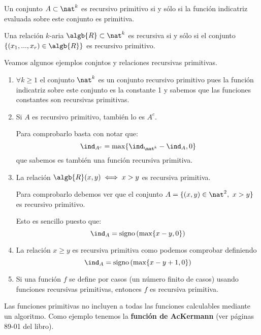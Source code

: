 \begin{defn}
Un conjunto $A \subset \nat^k$ es recursivo primitivo si y sólo si la función indicatriz evaluada sobre este conjunto es primitiva.
\end{defn}

\begin{defn}
Una relación $k$-aria $\algb{R} \subset \nat^k$ es recursiva  si y sólo si el conjunto $\{(x_1,...,x_r)\in \algb{R}\}$ es recursivo primitivo.
\end{defn}

Veamos algunos ejemplos conjntos y relaciones recursivas primitivas.
\begin{example}
\begin{enumerate}
\item $\forall k \geq 1$ el conjunto $\nat^k$ es un conjunto recursivo primitivo pues la función indicatriz sobre este conjunto es la constante 1 y sabemos que las funciones constantes son recursivas primitivas.

\item Si $A$ es recursivo primitivo, también lo es $A^c$.

Para comprobarlo basta con notar que:
\[\ind_{A^c} = \max\{\ind_{\nat^k}-\ind_{A},0\}\]
que sabemos es también una función recursiva primitiva.

\item La relación $\algb{R}(x,y) \iff x>y$ es recursiva primitiva.

Para comprobarlo debemos ver que el conjunto $A=\{(x,y) \in \nat^2, \ x>y\} $ es recursivo primitivo.

Esto es sencillo puesto que:
\[\ind_A = \text{signo}\left(\max\{x-y,0\}\right)\]

\item La relación $x\geq y$ es recursiva primitiva como podemos comprobar definiendo
\[\ind_A = \text{signo}\left(\max\{x-y+1,0\}\right)\]

\item Si una función $f$ se define por casos (un número finito de casos) usando funciones recursivas primitivas, entonces $f$ es recursiva primitiva.
\end{enumerate}
\end{example}

Las funciones primitivas no incluyen a todas las funciones calculables mediante un algoritmo. Como ejemplo tenemos la \textbf{función de AcKermann} (ver páginas 89-01 del libro).

